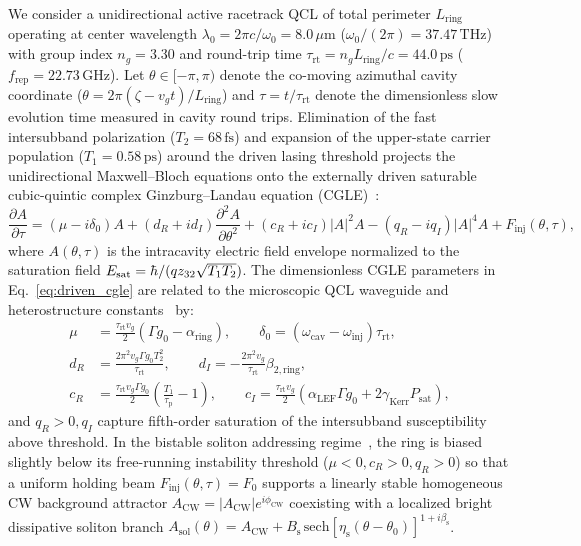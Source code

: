 \documentclass[11pt,letterpaper]{article}
\renewcommand{\hbar}{\mathchar'26\mkern-9mu h}
\begin{document}
We consider a unidirectional active racetrack QCL of total perimeter $L_{\mathrm{ring}}$ operating at center wavelength $\lambda_0 = 2\pi c/\omega_0 = 8.0\,\mu\mathrm{m}$ ($\omega_0/(2\pi) = 37.47\,\mathrm{THz}$) with group index $n_g = 3.30$ and round-trip time $\tau_{\mathrm{rt}} = n_g L_{\mathrm{ring}}/c = 44.0\,\mathrm{ps}$ ($f_{\mathrm{rep}} = 22.73\,\mathrm{GHz}$). Let $\theta \in [-\pi, \pi)$ denote the co-moving azimuthal cavity coordinate ($\theta = 2\pi(\zeta - v_g t)/L_{\mathrm{ring}}$) and $\tau = t/\tau_{\mathrm{rt}}$ denote the dimensionless slow evolution time measured in cavity round trips. Elimination of the fast intersubband polarization ($T_2 = 68\,\mathrm{fs}$) and expansion of the upper-state carrier population ($T_1 = 0.58\,\mathrm{ps}$) around the driven lasing threshold projects the unidirectional Maxwell--Bloch equations onto the externally driven saturable cubic-quintic complex Ginzburg--Landau equation (CGLE)~\cite{Columbo2021,Kazakov2025,ColumboRoadmap2025}:
\begin{equation}
\frac{\partial A}{\partial \tau} = \left(\mu - i\delta_0\right) A + \left(d_R + i d_I\right)\frac{\partial^2 A}{\partial \theta^2} + \left(c_R + i c_I\right)|A|^2 A - \left(q_R - i q_I\right)|A|^4 A + F_{\mathrm{inj}}(\theta, \tau),
\label{eq:driven_cgle}
\end{equation}
where $A(\theta, \tau)$ is the intracavity electric field envelope normalized to the saturation field $E_{\mathrm{sat}} = \hbar / (q z_{32}\sqrt{T_1 T_2})$. The dimensionless CGLE parameters in Eq.~\eqref{eq:driven_cgle} are related to the microscopic QCL waveguide and heterostructure constants~\cite{Vurgaftman2021,Columbo2021} by:
\begin{subequations}
\label{eq:cgle_coeffs}
\begin{align}
\mu &= \frac{\tau_{\mathrm{rt}} v_g}{2}\left( \Gamma g_0 - \alpha_{\mathrm{ring}} \right), \qquad \delta_0 = (\omega_{\mathrm{cav}} - \omega_{\mathrm{inj}})\tau_{\mathrm{rt}}, \label{eq:cgle_mu}\\
d_R &= \frac{2\pi^2 v_g \Gamma g_0 T_2^2}{\tau_{\mathrm{rt}}}, \qquad d_I = -\frac{2\pi^2 v_g}{\tau_{\mathrm{rt}}}\beta_{2,\mathrm{ring}}, \label{eq:cgle_d}\\
c_R &= \frac{\tau_{\mathrm{rt}} v_g \Gamma g_0}{2}\left(\frac{T_1}{\tau_{\mathrm{p}}} - 1\right), \qquad c_I = \frac{\tau_{\mathrm{rt}} v_g}{2}\left(\alpha_{\mathrm{LEF}}\Gamma g_0 + 2\gamma_{\mathrm{Kerr}}P_{\mathrm{sat}}\right), \label{eq:cgle_c}
\end{align}
\end{subequations}
and $q_R > 0, q_I$ capture fifth-order saturation of the intersubband susceptibility above threshold. In the bistable soliton addressing regime~\cite{Kazakov2025,ColumboRoadmap2025}, the ring is biased slightly below its free-running instability threshold ($\mu < 0, c_R > 0, q_R > 0$) so that a uniform holding beam $F_{\mathrm{inj}}(\theta, \tau) = F_0$ supports a linearly stable homogeneous CW background attractor $A_{\mathrm{CW}} = |A_{\mathrm{CW}}|e^{i\phi_{\mathrm{CW}}}$ coexisting with a localized bright dissipative soliton branch $A_{\mathrm{sol}}(\theta) = A_{\mathrm{CW}} + B_{\mathrm{s}}\,\mathrm{sech}[\eta_{\mathrm{s}}(\theta - \theta_0)]^{1 + i\beta_{\mathrm{s}}}$.
\end{document}
